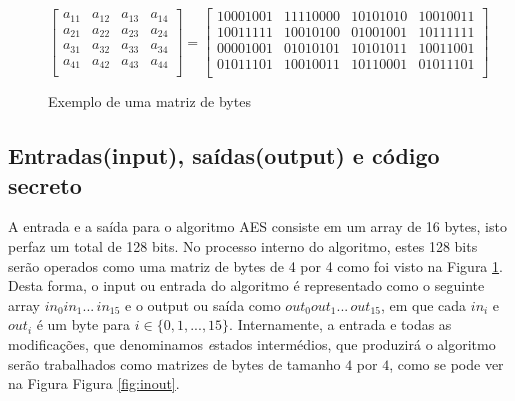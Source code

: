 \begin{figure}
\begin{figurebox}
\begin{center}
$
\left[
\begin{array}{cccc}
a_{11} & a_{12} & a_{13} & a_{14}\\
a_{21} & a_{22} & a_{23} & a_{24}\\
a_{31} & a_{32} & a_{33} & a_{34}\\
a_{41} & a_{42} & a_{43} & a_{44}\\
\end{array}
\right]=\left[
\begin{array}{c|c|c|c}
10001001 & 11110000 & 10101010 & 10010011\\\hline
10011111 & 10010100 & 01001001 & 10111111\\\hline
00001001 & 01010101 & 10101011 & 10011001\\\hline
01011101 & 10010011 & 10110001 & 01011101\\
\end{array}
\right]
$
\end{center}\caption{Exemplo de uma matriz de bytes}\label{fig:matrizbytes}
\end{figurebox}
\end{figure}



\subsection{Entradas(input), saídas(output) e código secreto}\label{ss:input}

A entrada e a saída para o algoritmo AES consiste em um array de 16 bytes, isto perfaz um total de 128 bits. No processo interno do algoritmo, estes 128 bits serão operados como uma matriz de bytes de 4 por 4 como foi visto na Figura \ref{fig:matrizbytes}. Desta forma, o input ou entrada do algoritmo é representado como o seguinte array   $in_{0}in_{1}...\,in_{15}$ e o output ou saída como  $out_{0}out_{1}...\,out_{15}$, em que cada  $in_{i}$ e  $out_{i}$ é um byte para $i \in \{0,1,...,15\}$. Internamente, a entrada e todas as modificações, que denominamos {\textsl estados intermédios}, que produzirá o algoritmo serão trabalhados como matrizes de bytes de tamanho $4$ por $4$, como se pode ver na Figura Figura \ref{fig:inout}.

